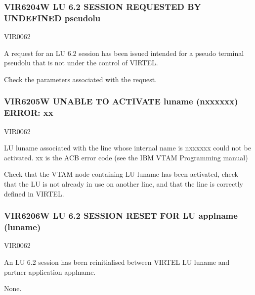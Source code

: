 \documentclass[letterpaper,10pt,english]{sphinxmanual}
\begin{document}
\subsubsection{VIR6204W LU 6.2 SESSION REQUESTED BY UNDEFINED pseudolu}
\label{\detokenize{messages:vir6204w-lu-6-2-session-requested-by-undefined-pseudolu}}\begin{description}
\sphinxAtStartPar
VIR0062

\sphinxAtStartPar
A request for an LU 6.2 session has been issued intended for a pseudo terminal pseudolu that is not under the control of VIRTEL.

\sphinxAtStartPar
Check the parameters associated with the request.

\end{description}


\subsubsection{VIR6205W UNABLE TO ACTIVATE luname (n\sphinxhyphen{}xxxxxx) ERROR: xx}
\label{\detokenize{messages:vir6205w-unable-to-activate-luname-n-xxxxxx-error-xx}}\begin{description}
\sphinxAtStartPar
VIR0062

\sphinxAtStartPar
LU luname associated with the line whose internal name is n\sphinxhyphen{}xxxxxx could not be activated. xx is the ACB error code (see the IBM VTAM Programming manual)

\sphinxAtStartPar
Check that the VTAM node containing LU luname has been activated, check that the LU is not already in use on another line, and that the line is correctly defined in VIRTEL.

\end{description}


\subsubsection{VIR6206W LU 6.2 SESSION RESET FOR LU applname (luname)}
\label{\detokenize{messages:vir6206w-lu-6-2-session-reset-for-lu-applname-luname}}\begin{description}
\sphinxAtStartPar
VIR0062

\sphinxAtStartPar
An LU 6.2 session has been reinitialised between VIRTEL LU luname and partner application applname.

\sphinxAtStartPar
None.

\end{description}
\end{document}
